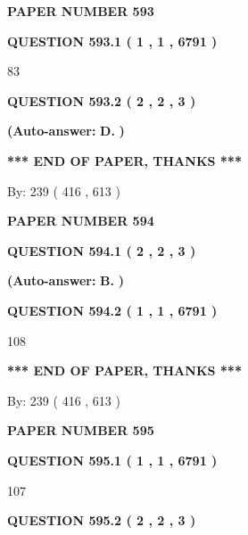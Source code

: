 \documentclass[12pt]{article}
\begin{document}
   
\newpage 
\setcounter{page}{ 
   593001 } 
   
   
 {\textbf{ \Large{ PAPER NUMBER  593  }}}
   
   
   
   
  
  
{\textbf{\large{QUESTION
593.1 
 ( 1 , 1 , 6791 )
}}}

83
  
  
{\textbf{\large{QUESTION
593.2 
 ( 2 , 2 , 3 )
}}}
 
 
{\textbf{(Auto-answer:}}
{\textbf{\large{
D.}}}
{\textbf{)}}
 
 
   
   
   
   
\vspace{1.0in} 
{\textbf{\large{ *** END OF PAPER, THANKS *** }}} 
   
   
\hspace{1.0in} By: 
 239 ( 416 ,  613 )
   
   
   
   
\newpage 
\setcounter{page}{ 
   594001 } 
   
   
 {\textbf{ \Large{ PAPER NUMBER  594  }}}
   
   
   
   
  
  
{\textbf{\large{QUESTION
594.1 
 ( 2 , 2 , 3 )
}}}
 
 
{\textbf{(Auto-answer:}}
{\textbf{\large{
B.}}}
{\textbf{)}}
 
 
  
  
{\textbf{\large{QUESTION
594.2 
 ( 1 , 1 , 6791 )
}}}

108
   
   
   
   
\vspace{1.0in} 
{\textbf{\large{ *** END OF PAPER, THANKS *** }}} 
   
   
\hspace{1.0in} By: 
 239 ( 416 ,  613 )
   
   
   
   
\newpage 
\setcounter{page}{ 
   595001 } 
   
   
 {\textbf{ \Large{ PAPER NUMBER  595  }}}
   
   
   
   
  
  
{\textbf{\large{QUESTION
595.1 
 ( 1 , 1 , 6791 )
}}}

107
  
  
{\textbf{\large{QUESTION
595.2 
 ( 2 , 2 , 3 )
}}}
 
\end{document}
